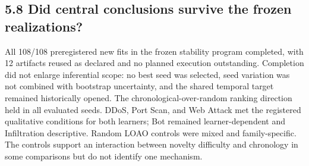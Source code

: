 \documentclass[preprint,12pt]{elsarticle}
\begin{document}
\subsection{5.8 Did central conclusions survive the frozen realizations?}
All 108/108 preregistered new fits in the frozen stability program completed, with 12 artifacts reused as declared and no planned execution outstanding. Completion did not enlarge inferential scope: no best seed was selected, seed variation was not combined with bootstrap uncertainty, and the shared temporal target remained historically opened.
The chronological-over-random ranking direction held in all evaluated seeds. DDoS, Port Scan, and Web Attack met the registered qualitative conditions for both learners; Bot remained learner-dependent and Infiltration descriptive. Random LOAO controls were mixed and family-specific. The controls support an interaction between novelty difficulty and chronology in some comparisons but do not identify one mechanism.
\end{document}
